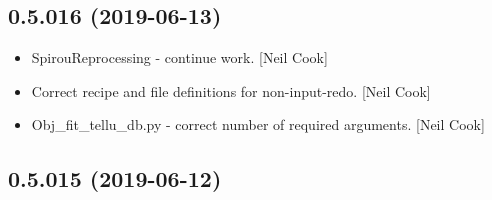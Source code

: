 \documentclass[a4paper,10pt,english]{report}
\begin{document}
\subsection{0.5.016 (2019-06-13)}
\label{\detokenize{misc/changelog:id119}}\begin{itemize}
\item {} 
SpirouReprocessing - continue work. {[}Neil Cook{]}

\item {} 
Correct recipe and file definitions for non-input-redo. {[}Neil Cook{]}

\item {} 
Obj\_fit\_tellu\_db.py - correct number of required arguments. {[}Neil
Cook{]}

\end{itemize}


\subsection{0.5.015 (2019-06-12)}
\end{document}
